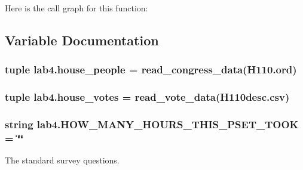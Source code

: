 Here is the call graph for this function\+:




\subsection{Variable Documentation}
\hypertarget{namespacelab4_aa3012299c849f02ae31ae12757cf2f47}{}
\subsubsection[{house\+\_\+people}]{\setlength{\rightskip}{0pt plus 5cm}tuple lab4.\+house\+\_\+people = read\+\_\+congress\+\_\+data(\textquotesingle{}H110.\+ord\textquotesingle{})}\label{namespacelab4_aa3012299c849f02ae31ae12757cf2f47}
\hypertarget{namespacelab4_aaf99ce787c94a9fc9d4d77942cf300c3}{}
\subsubsection[{house\+\_\+votes}]{\setlength{\rightskip}{0pt plus 5cm}tuple lab4.\+house\+\_\+votes = read\+\_\+vote\+\_\+data(\textquotesingle{}H110desc.\+csv\textquotesingle{})}\label{namespacelab4_aaf99ce787c94a9fc9d4d77942cf300c3}
\hypertarget{namespacelab4_a603179138a7ff56fcea1a59347d8154c}{}
\subsubsection[{H\+O\+W\+\_\+\+M\+A\+N\+Y\+\_\+\+H\+O\+U\+R\+S\+\_\+\+T\+H\+I\+S\+\_\+\+P\+S\+E\+T\+\_\+\+T\+O\+O\+K}]{\setlength{\rightskip}{0pt plus 5cm}string lab4.\+H\+O\+W\+\_\+\+M\+A\+N\+Y\+\_\+\+H\+O\+U\+R\+S\+\_\+\+T\+H\+I\+S\+\_\+\+P\+S\+E\+T\+\_\+\+T\+O\+O\+K = \char`\"{}\char`\"{}}\label{namespacelab4_a603179138a7ff56fcea1a59347d8154c}


The standard survey questions. 

